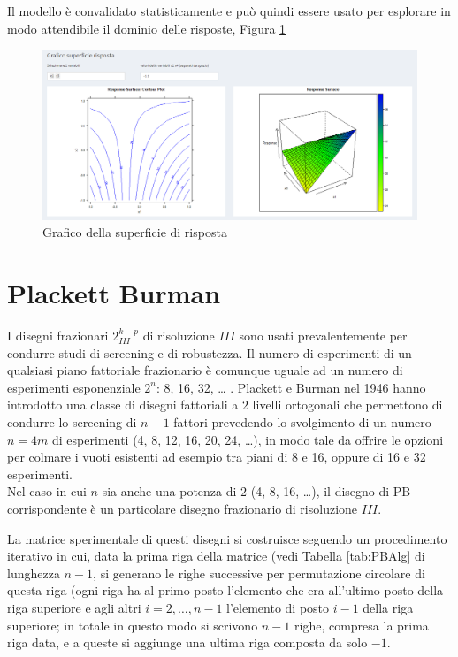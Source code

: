 \documentclass[
  11pt,
]{book}
\begin{document}
Il modello è convalidato statisticamente e può quindi essere usato per esplorare in modo attendibile il dominio delle risposte, Figura \ref{fig:fz10}

\begin{figure}[ht]

{\centering \includegraphics[width=1\linewidth]{Immagini/Fraz/10_sup_risp} 

}

\caption{Grafico della superficie di risposta}\label{fig:fz10}
\end{figure}

\hypertarget{plackett-burman}{%
\chapter{Plackett Burman}\label{plackett-burman}}

I disegni frazionari \(2_{III}^{k-p}\) di risoluzione \(III\) sono usati prevalentemente per condurre studi di screening e di robustezza. Il numero di esperimenti di un qualsiasi piano fattoriale frazionario è comunque uguale ad un numero di esperimenti esponenziale \(2^n\): 8, 16, 32, \ldots{} .
Plackett e Burman nel 1946 hanno introdotto una classe di disegni fattoriali a \(2\) livelli ortogonali che permettono di condurre lo screening di \(n-1\) fattori prevedendo lo svolgimento di un numero \(n=4m\) di esperimenti (4, 8, 12, 16, 20, 24, \ldots), in modo tale da offrire le opzioni per colmare i vuoti esistenti ad esempio tra piani di 8 e 16, oppure di 16 e 32 esperimenti.\\
Nel caso in cui \(n\) sia anche una potenza di \(2\) (4, 8, 16, \ldots), il disegno di PB corrispondente è un particolare disegno frazionario di risoluzione \(III\).

La matrice sperimentale di questi disegni si costruisce seguendo un procedimento iterativo in cui, data la prima riga della matrice (vedi Tabella \ref{tab:PBAlg} di lunghezza \(n-1\), si generano le righe successive per permutazione circolare di questa riga (ogni riga ha al primo posto l'elemento che era all'ultimo posto della riga superiore e agli altri \(i=2,\dots, n-1\) l'elemento di posto \(i-1\) della riga superiore; in totale in questo modo si scrivono \(n-1\) righe, compresa la prima riga data, e a queste si aggiunge una ultima riga composta da solo \(-1\).
\end{document}
